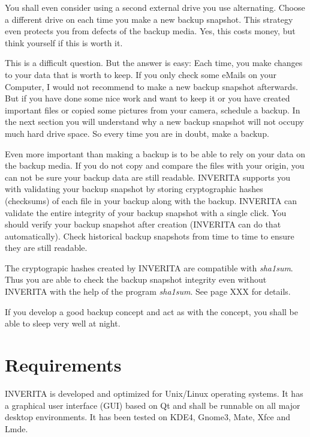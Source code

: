 You shall even consider using a second external drive you use alternating. Choose a
different drive on each time you make a new backup snapshot. This strategy even protects
you from defects of the backup media. Yes, this costs money, but think yourself if this
is worth it.

This is a difficult question. But the answer is easy: Each time, you make changes to your data
that is worth to keep. If you only check some eMails on your Computer, I would not
recommend to make a new backup snapshot afterwards. But if you have done some nice work
and want to keep it or you have created important files or copied some pictures from your
camera, schedule a backup. In the next section you will understand why a new backup snapshot
will not occupy much hard drive space. So every time you are in doubt, make a backup.

Even more important than making a backup is to be able to rely on your data  on the
backup media. If you do not copy and compare the files with your origin, you can
not be sure your backup data are still readable.
INVERITA supports you with validating your backup snapshot by storing cryptographic
hashes (checksums) of each file in your backup along with the backup. INVERITA can
validate the entire integrity of your backup snapshot with a single click.
You should verify your backup snapshot after creation (INVERITA can do that automatically).
Check historical backup snapshots from time to time to ensure they are still readable.

\begin{info}
The cryptograpic hashes created by INVERITA are compatible with \emph{sha1sum}.
Thus you are able to check the backup snapshot integrity even without INVERITA
with the help of the program \emph{sha1sum}. See page XXX for details.
\end{info}

If you develop a good backup concept and act as with the concept, you shall be able
to sleep very well at night.


\section{Requirements}
INVERITA is developed and optimized for Unix/Linux operating systems. It has a
graphical user interface (GUI) based on Qt and shall be runnable on all major
desktop environments. It has been tested on KDE4, Gnome3, Mate, Xfce and Lmde.

